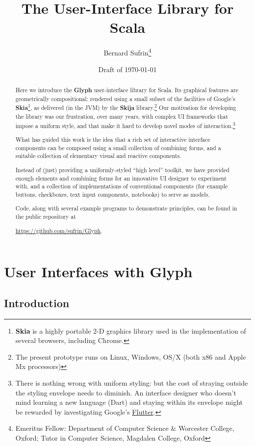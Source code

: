 \documentclass[12pt,a4paper]{article}
\author{Bernard Sufrin\thanks{Emeritus Fellow: Department of Computer
Science \& Worcester College, Oxford; Tutor in Computer Science,
Magdalen College, Oxford}}
\title{The \Glyph User-Interface Library for Scala}
\date{Draft of \today}
\def\Glyph{\textbf{Glyph}\xspace}
\def\Skia{\textbf{Skia}\xspace}
\def\S#1{\section{#1}}
\def\SS#1{\subsection{#1}}
\begin{document}
\maketitle
\begin{abstract}

Here we introduce the \Glyph user-interface library for Scala.  Its
graphical features are geometrically compositional:  rendered using
a small subset of the facilities of  Google's \Skia{\footnote{\Skia
is a highly portable 2-D graphics library used in the implementation of several
browsers, including Chrome.}}, as delivered (in the JVM) by the \textbf{Skija}
library.\footnote{The present prototype
runs on Linux, Windows, OS/X (both x86 and Apple Mx processors)}
%
Our motivation for developing the library was our frustration, over many years,
with complex UI frameworks that impose a uniform style, and that make
it hard to develop novel modes of interaction.\footnote{There is
nothing wrong with uniform styling: but the cost of straying outside
the styling envelope needs to diminish. An interface designer
who doesn't mind learning a new language (Dart) and staying within its
envelope might be rewarded by investigating Google's
\href{https://api.flutter.dev/index.html}{Flutter}.} 

What has guided this work is the idea that a rich set of interactive
interface components can be composed using a small collection of combining
forms, and a suitable collection of elementary visual
and reactive components.

Instead of (just) providing a uniformly-styled ``high level''
toolkit, we have provided enough elements and combining forms for
an innovative UI designer to experiment with, and a collection of
implementations of conventional components (for example buttons,
checkboxes, text input components, notebooks) to serve as models.

Code, along with several  example programs to demonstrate principles,
can be found in the public repository at
\begin{center}
\href{https://github.com/sufrin/Glyph}{https://github.com/sufrin/Glyph}.
\end{center}\vfill
\end{abstract}
\clearpage
\tableofcontents
\clearpage
\listoffigures
\clearpage



\S{User Interfaces with Glyph}
\SS{Introduction}
\end{document}
